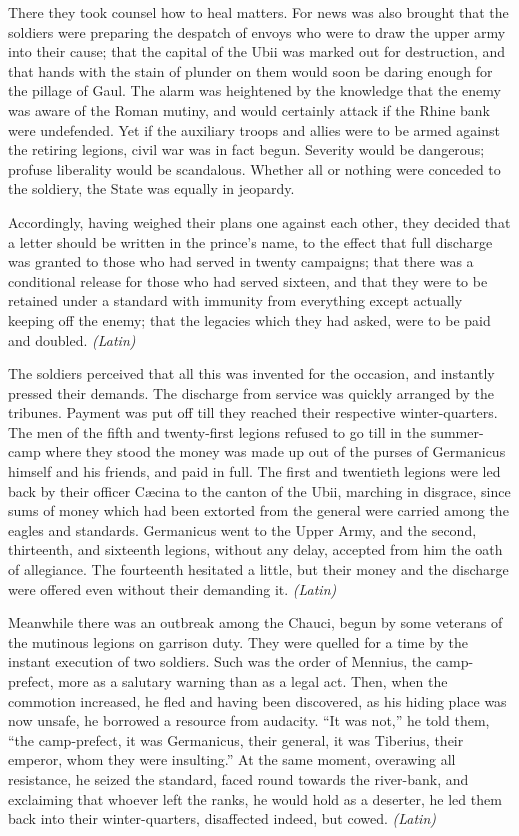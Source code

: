 
There they took counsel how to heal matters. For news was also brought that the soldiers were preparing the despatch of envoys who were to draw the upper army into their cause; that the capital of the Ubii was marked out for destruction, and that hands with the stain of plunder on them would soon be daring enough for the pillage of Gaul. The alarm was heightened by the knowledge that the enemy was aware of the Roman mutiny, and would certainly attack if the Rhine bank were undefended. Yet if the auxiliary troops and allies were to be armed against the retiring legions, civil war was in fact begun. Severity would be dangerous; profuse liberality would be scandalous. Whether all or nothing were conceded to the soldiery, the State was equally in jeopardy.

Accordingly, having weighed their plans one against each other, they decided that a letter should be written in the prince's name, to the effect that full discharge was granted to those who had served in twenty campaigns; that there was a conditional release for those who had served sixteen, and that they were to be retained under a standard with immunity from everything except actually keeping off the enemy; that the legacies which they had asked, were to be paid and doubled. \emph{(Latin)}


The soldiers perceived that all this was invented for the occasion, and instantly pressed their demands. The discharge from service was quickly arranged by the tribunes. Payment was put off till they reached their respective winter-quarters. The men of the fifth and twenty-first legions refused to go till in the summer-camp where they stood the money was made up out of the purses of Germanicus himself and his friends, and paid in full. The first and twentieth legions were led back by their officer Cæcina to the canton of the Ubii, marching in disgrace, since sums of money which had been extorted from the general were carried among the eagles and standards. Germanicus went to the Upper Army, and the second, thirteenth, and sixteenth legions, without any delay, accepted from him the oath of allegiance. The fourteenth hesitated a little, but their money and the discharge were offered even without their demanding it. \emph{(Latin)}


Meanwhile there was an outbreak among the Chauci, begun by some veterans of the mutinous legions on garrison duty. They were quelled for a time by the instant execution of two soldiers. Such was the order of Mennius, the camp-prefect, more as a salutary warning than as a legal act. Then, when the commotion increased, he fled and having been discovered, as his hiding place was now unsafe, he borrowed a resource from audacity. ``It was not,'' he told them, ``the camp-prefect, it was Germanicus, their general, it was Tiberius, their emperor, whom they were insulting.'' At the same moment, overawing all resistance, he seized the standard, faced round towards the river-bank, and exclaiming that whoever left the ranks, he would hold as a deserter, he led them back into their winter-quarters, disaffected indeed, but cowed. \emph{(Latin)}

